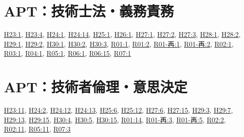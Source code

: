 \section{APT：技術士法・義務責務}
\hyperref[q:h23-reg-apt-01]{H23:1}, \hyperref[q:h23-reg-apt-04]{H23:4}, \hyperref[q:h24-reg-apt-01]{H24:1}, \hyperref[q:h24-reg-apt-14]{H24:14}, \hyperref[q:h25-reg-apt-01]{H25:1}, \hyperref[q:h26-reg-apt-01]{H26:1}, \hyperref[q:h27-reg-apt-01]{H27:1}, \hyperref[q:h27-reg-apt-02]{H27:2}, \hyperref[q:h27-reg-apt-03]{H27:3}, \hyperref[q:h28-reg-apt-01]{H28:1}, \hyperref[q:h28-reg-apt-02]{H28:2}, \hyperref[q:h29-reg-apt-01]{H29:1}, \hyperref[q:h29-reg-apt-02]{H29:2}, \hyperref[q:h30-reg-apt-01]{H30:1}, \hyperref[q:h30-reg-apt-02]{H30:2}, \hyperref[q:h30-reg-apt-03]{H30:3}, \hyperref[q:r01-reg-apt-01]{R01:1}, \hyperref[q:r01-reg-apt-02]{R01:2}, \hyperref[q:r01-ret-apt-01]{R01-再:1}, \hyperref[q:r01-ret-apt-02]{R01-再:2}, \hyperref[q:r02-reg-apt-01]{R02:1}, \hyperref[q:r03-reg-apt-01]{R03:1}, \hyperref[q:r04-reg-apt-01]{R04:1}, \hyperref[q:r05-reg-apt-01]{R05:1}, \hyperref[q:r06-reg-apt-01]{R06:1}, \hyperref[q:r06-reg-apt-15]{R06:15}, \hyperref[q:r07-reg-apt-01]{R07:1}
\section{APT：技術者倫理・意思決定}
\hyperref[q:h23-reg-apt-11]{H23:11}, \hyperref[q:h24-reg-apt-02]{H24:2}, \hyperref[q:h24-reg-apt-12]{H24:12}, \hyperref[q:h24-reg-apt-13]{H24:13}, \hyperref[q:h25-reg-apt-06]{H25:6}, \hyperref[q:h25-reg-apt-12]{H25:12}, \hyperref[q:h27-reg-apt-06]{H27:6}, \hyperref[q:h27-reg-apt-15]{H27:15}, \hyperref[q:h29-reg-apt-03]{H29:3}, \hyperref[q:h29-reg-apt-07]{H29:7}, \hyperref[q:h29-reg-apt-13]{H29:13}, \hyperref[q:h29-reg-apt-15]{H29:15}, \hyperref[q:h30-reg-apt-04]{H30:4}, \hyperref[q:h30-reg-apt-05]{H30:5}, \hyperref[q:h30-reg-apt-15]{H30:15}, \hyperref[q:r01-reg-apt-14]{R01:14}, \hyperref[q:r01-ret-apt-03]{R01-再:3}, \hyperref[q:r01-ret-apt-05]{R01-再:5}, \hyperref[q:r02-reg-apt-02]{R02:2}, \hyperref[q:r02-reg-apt-11]{R02:11}, \hyperref[q:r05-reg-apt-11]{R05:11}, \hyperref[q:r07-reg-apt-03]{R07:3}
